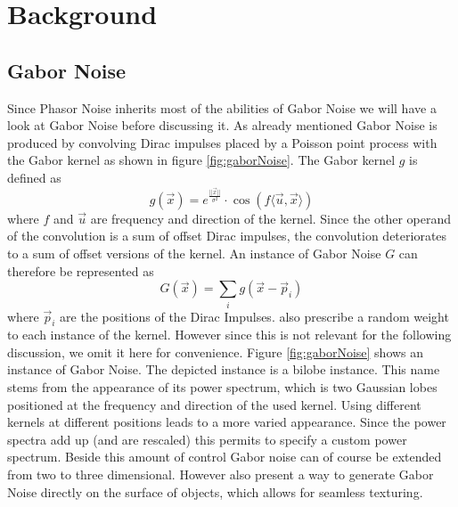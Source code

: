 \documentclass{utue} %
\begin{document}
\section{Background}
\subsection{Gabor Noise}
Since Phasor Noise inherits most of the abilities of Gabor Noise we will have a look at Gabor Noise before discussing it. As already mentioned Gabor Noise is produced by convolving Dirac impulses placed by a Poisson point process with the Gabor kernel as shown in figure \ref{fig:gaborNoise}. The Gabor kernel $g$ is defined as
$$
g(\vec{x}) = e^{\frac{||\vec{x}||}{\sigma^2}}\cdot \cos{(f\langle\vec{u},\vec{x}\rangle)}
$$
where $f$ and $\vec{u}$ are frequency and direction of the kernel. Since the other operand of the convolution is a sum of offset Dirac impulses, the convolution deteriorates to a sum of offset versions of the kernel. An instance of Gabor Noise $G$ can therefore be represented as
$$
G(\vec{x}) = \sum_ig(\vec{x}-\vec{p}_i)
$$
where $\vec{p}_i$ are the positions of the Dirac Impulses. \citeauthor{gaborNoise} also prescribe a random weight to each instance of the kernel. However since this is not relevant for the following discussion, we omit it here for convenience. Figure \ref{fig:gaborNoise} shows an instance of Gabor Noise. The depicted instance is a bilobe instance. This name stems from the appearance of its power spectrum, which is two Gaussian lobes positioned at the frequency and direction of the used kernel. Using different kernels at different positions leads to a more varied appearance. Since the power spectra add up (and are rescaled) this permits to specify a custom power spectrum. Beside this amount of control Gabor noise can of course be extended from two to three dimensional. However \citeauthor{gaborNoise} also present a way to generate Gabor Noise directly on the surface of objects, which allows for seamless texturing.
\end{document}
